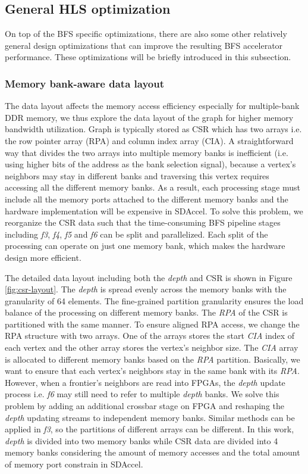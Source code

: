 \subsection{General HLS optimization}
On top of the BFS specific optimizations, there are also 
some other relatively general design optimizations that can improve the 
resulting BFS accelerator performance. These optimizations will be briefly 
introduced in this subsection.

\subsubsection{Memory bank-aware data layout}
The data layout affects the memory access efficiency 
especially for multiple-bank DDR memory, we thus explore the 
data layout of the graph for higher memory bandwidth utilization. 
Graph is typically stored as CSR which has two arrays i.e. the row pointer 
array (RPA) and column index array (CIA). A straightforward way that 
divides the two arrays into multiple memory banks is inefficient (i.e. using higher bits of the 
address as the bank selection signal), because a vertex's neighbors may stay in different 
banks and traversing this vertex requires accessing all the different memory banks. 
As a result, each processing stage must include all the memory ports attached 
to the different memory banks and the hardware implementation will be expensive 
in SDAccel. To solve this problem, we reorganize the CSR data such that the 
time-consuming BFS pipeline stages including \textit{f3}, \textit{f4}, \textit{f5} and \textit{f6} 
can be split and parallelized. Each split of the processing can operate 
on just one memory bank, which makes the hardware design more efficient.

The detailed data layout including both the \textit{depth} and 
CSR is shown in Figure \ref{fig:csr-layout}.
The \textit{depth} is spread evenly across the memory banks 
with the granularity of 64 elements. The fine-grained partition 
granularity ensures the load balance of the processing on 
different memory banks. The \textit{RPA} of the CSR is partitioned 
with the same manner. To ensure aligned RPA access, we change the 
RPA structure with two arrays. One of the arrays stores the start \textit{CIA} 
index of each vertex and the other array stores the vertex's neighbor size.
The \textit{CIA} array is allocated to different memory banks 
based on the \textit{RPA} partition. Basically, we want to ensure that each vertex's 
neighbors stay in the same bank with its \textit{RPA}. However, when a frontier's neighbors 
are read into FPGAs, the \textit{depth} update process i.e. \textit{f6} may still need to refer to multiple 
\textit{depth} banks. We solve this problem by adding an additional crossbar stage on FPGA and 
reshaping the \textit{depth} updating streams to independent memory banks. Similar methods 
can be applied in \textit{f3}, so the partitions of different arrays can be different.
In this work, \textit{depth} is divided into two memory banks 
while CSR data are divided into 4 memory banks considering the 
amount of memory accesses and the total amount of memory port constrain in SDAccel.

